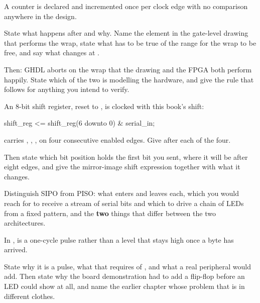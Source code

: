 \label{exa:q:6}

 A counter is declared  and incremented once
per clock edge with no comparison anywhere in the design.

State what happens after  and why. Name the element in the gate-level drawing that performs
the wrap, state what has to be true of the range for the wrap to be free, and say what changes at
.

Then: GHDL aborts on the wrap that the drawing and the FPGA both perform happily. State which of the
two is modelling the hardware, and give the rule that follows for anything you intend to verify.

 An 8-bit shift register, reset to , is clocked with this book's shift:

\begin{vhdlcode}
shift_reg <= shift_reg(6 downto 0) & serial_in;
\end{vhdlcode}

\noindent{} carries , , ,  on four consecutive enabled
edges. Give  after each of the four.

Then state which bit position holds the first bit you sent, where it will be after eight edges, and
give the mirror-image shift expression together with what it changes. 

 Distinguish SIPO from PISO: what enters and leaves each, which you would reach for to
receive a stream of serial bits and which to drive a chain of LEDs from a fixed pattern, and the
\textbf{two} things that differ between the two architectures. 

 In ,  is a one-cycle pulse rather than a level that
stays high once a byte has arrived.

State why it is a pulse, what that requires of , and what a real peripheral would
add. Then state why the board demonstration had to add a flip-flop before an LED could show
 at all, and name the earlier chapter whose problem that is in different clothes.

\label{exa:q:7}

